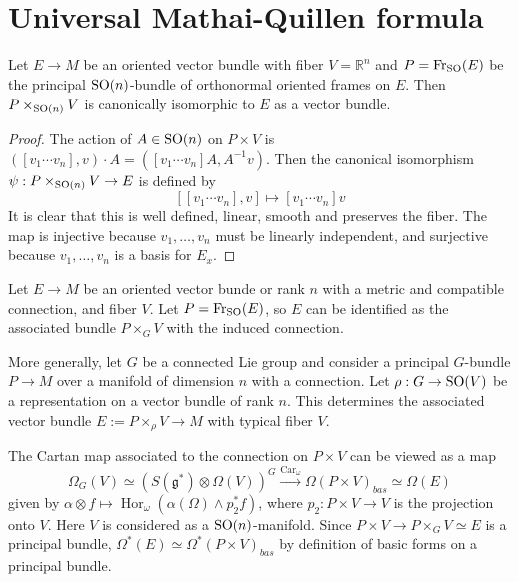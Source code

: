 \section{Universal Mathai-Quillen formula}
\begin{prop}
	Let $E\to M$ be an oriented vector bundle with fiber $V=\mathbb{R}^n$ 
	and  $P=\operatorname{Fr}_{\operatorname{SO}}(E)$ be the
	principal $\operatorname{SO}(n)$-bundle of orthonormal oriented frames on  $E$. Then 
	$P\times_{\operatorname{SO}(n)} V$ is canonically isomorphic to $E$ as a vector bundle. 
\end{prop} 
\begin{proof}
	The action of $A\in\operatorname{SO}(n)$ on $P\times V$ is 
	$
		([v_1 \cdots v_n], v) \cdot A = ([v_1 \cdots v_n] A, A^{-1} v) 
	$.
	Then the canonical isomorphism $\psi : P\times_{\operatorname{SO}(n)} V \to E$ is defined by
	\[
		[[v_1 \cdots v_n], v] \mapsto [v_1 \cdots v_n] v
	\] 
	It is clear that this is well defined, linear, smooth and preserves the
	fiber. The map is injective because $v_1,\ldots,v_n$ must be linearly
	independent, and surjective because $v_1,\ldots,v_n$ is a basis for $E_x$.
\end{proof}
Let $E\to M$ be an oriented vector bunde or rank  $n$ with a
metric and compatible connection, and fiber $V$. 
Let $P=\operatorname{Fr}_{\operatorname{SO}}(E)$, so 
$E$ can be identified as the associated bundle $P\times_G V$ with the
induced connection. 

More generally, let $G$ be a connected Lie group and 
consider a principal $G$-bundle  $P\to M$ over a manifold of
dimension $n$ with a connection. Let $\rho : G \to \operatorname{SO}(V)$ be a representation 
on a vector bundle of rank  $n$. 
This determines the associated vector bundle  $E:=P\times_\rho V \to M$
with typical fiber $V$. 

The Cartan map associated to the 
connection on $P\times V$ can be viewed as a map 
\[
	\Omega_G(V) \simeq (S(\mathfrak{g}^*)\otimes \Omega(V))^G 
	\xrightarrow{\operatorname{Car}_{\omega}} \Omega(P\times V)_{bas}\simeq
	\Omega(E)
\] 
given by $\alpha\otimes f \mapsto \operatorname{Hor}_{\omega}(\alpha(\Omega) 
\wedge p_2^* f)$, where $p_2 : P\times V \to V$ is the projection onto $V$.
Here $V$ is considered as a $\operatorname{SO}(n)$-manifold. 
Since  $P\times V \to P\times_G V \simeq E$ is a principal bundle,
$\Omega^*(E)\simeq \Omega^*(P\times V)_{bas}$ by definition of basic forms on a
principal bundle.


